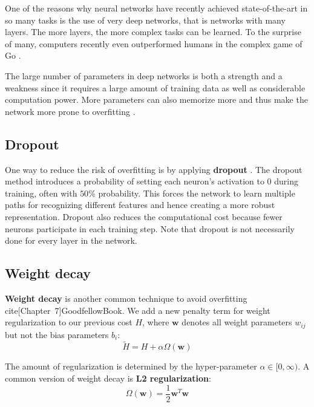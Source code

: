 One of the reasons why neural networks have recently achieved state-of-the-art in so many tasks is the use of very deep networks, that is networks with many layers.
The more layers, the more complex tasks can be learned. To the surprise of many, computers recently even outperformed humans in the complex game of Go \cite{AlphaGo, AlphaGoTuringTest}.

The large number of parameters in deep networks is both a strength and a weakness since it requires a large amount of training data as well as considerable computation power. More parameters can also memorize more and thus make the network more prone to overfitting \cite{AlexNet}.

\subsection{Dropout}

One way to reduce the risk of overfitting is by applying \textbf{dropout}  \cite{Dropout, AlexNet, FornesCnnCategorization}.
The dropout method introduces a probability of setting each neuron's activation to $0$ during training, often with $50\%$ probability. This forces the network to learn multiple paths for recognizing different features and hence creating a more robust representation. Dropout also reduces the computational cost because fewer neurons participate in each training step.
Note that dropout is not necessarily done for every layer in the network.


\subsection{Weight decay}

\textbf{Weight decay} \cite{WeightDecay} is another common technique to avoid overfitting cite[Chapter~7]{GoodfellowBook}. We add a new penalty term for weight regularization to our previous cost $H$, where $\mathbf{w}$ denotes all weight parameters $w_{ij}$ but not the bias parameters $b_i$:
\[
\tilde{H} = H + \alpha \Omega(\mathbf{w})
\]

The amount of regularization is determined by the hyper-parameter $\alpha \in [0,\infty)$.
A common version of weight decay is \textbf{L2 regularization}:
\[
\Omega(\mathbf{w}) = \frac{1}{2} \mathbf{w}^T \mathbf{w}
\]

